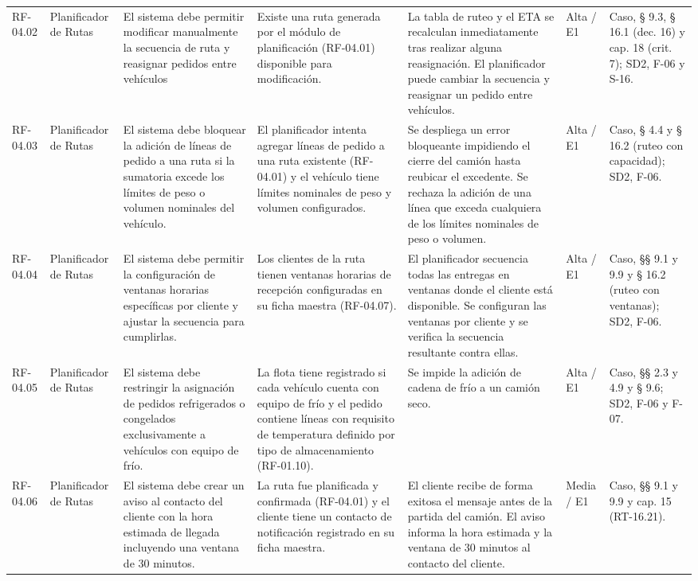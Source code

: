 {\begin{longtable}{@{}F{0.062} F{0.080} F{0.195} F{0.160} F{0.240} F{0.093} F{0.170}@{}}
  RF-04.02 & Planificador de Rutas & El sistema debe permitir modificar manualmente la secuencia de ruta y reasignar pedidos entre vehículos & Existe una ruta generada por el módulo de planificación (RF-04.01) disponible para modificación. & La tabla de ruteo y el ETA se recalculan inmediatamente tras realizar alguna reasignación. El planificador puede cambiar la secuencia y reasignar un pedido entre vehículos. & Alta / E1 & Caso, § 9.3, § 16.1 (dec. 16) y cap. 18 (crit. 7); SD2, F-06 y S-16. \\
  RF-04.03 & Planificador de Rutas & El sistema debe bloquear la adición de líneas de pedido a una ruta si la sumatoria excede los límites de peso o volumen nominales del vehículo. & El planificador intenta agregar líneas de pedido a una ruta existente (RF-04.01) y el vehículo tiene límites nominales de peso y volumen configurados. & Se despliega un error bloqueante impidiendo el cierre del camión hasta reubicar el excedente. Se rechaza la adición de una línea que exceda cualquiera de los límites nominales de peso o volumen. & Alta / E1 & Caso, § 4.4 y § 16.2 (ruteo con capacidad); SD2, F-06. \\
  RF-04.04 & Planificador de Rutas & El sistema debe permitir la configuración de ventanas horarias específicas por cliente y ajustar la secuencia para cumplirlas. & Los clientes de la ruta tienen ventanas horarias de recepción configuradas en su ficha maestra (RF-04.07). & El planificador secuencia todas las entregas en ventanas donde el cliente está disponible. Se configuran las ventanas por cliente y se verifica la secuencia resultante contra ellas. & Alta / E1 & Caso, §§ 9.1 y 9.9 y § 16.2 (ruteo con ventanas); SD2, F-06. \\
  RF-04.05 & Planificador de Rutas & El sistema debe restringir la asignación de pedidos refrigerados o congelados exclusivamente a vehículos con equipo de frío. & La flota tiene registrado si cada vehículo cuenta con equipo de frío y el pedido contiene líneas con requisito de temperatura definido por tipo de almacenamiento (RF-01.10). & Se impide la adición de cadena de frío a un camión seco. & Alta / E1 & Caso, §§ 2.3 y 4.9 y § 9.6; SD2, F-06 y F-07. \\
  RF-04.06 & Planificador de Rutas & El sistema debe crear un aviso al contacto del cliente con la hora estimada de llegada incluyendo una ventana de 30 minutos. & La ruta fue planificada y confirmada (RF-04.01) y el cliente tiene un contacto de notificación registrado en su ficha maestra. & El cliente recibe de forma exitosa el mensaje antes de la partida del camión. El aviso informa la hora estimada y la ventana de 30 minutos al contacto del cliente. & Media / E1 & Caso, §§ 9.1 y 9.9 y cap. 15 (RT-16.21). \\

\end{longtable}}
